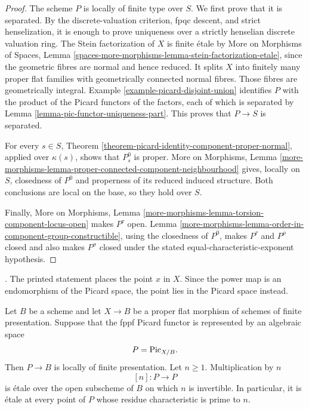 \begin{proof}
The scheme $P$ is locally of finite type over $S$. We first prove that it is
separated. By the discrete-valuation criterion, fpqc descent, and strict
henselization, it is enough to prove uniqueness over a strictly henselian
discrete valuation ring. The Stein factorization of $X$ is finite \'etale by
More on Morphisms of Spaces, Lemma
\ref{spaces-more-morphisms-lemma-stein-factorization-etale}, since the
geometric fibres are normal and hence reduced. It splits $X$ into finitely
many proper flat families with geometrically connected normal fibres. Those
fibres are geometrically integral. Example
\ref{example-picard-disjoint-union} identifies $P$ with the product of the
Picard functors of the factors, each of which is separated by Lemma
\ref{lemma-pic-functor-uniqueness-part}. This proves that $P\to S$ is
separated.

For every $s\in S$, Theorem
\ref{theorem-picard-identity-component-proper-normal}, applied over
$\kappa(s)$, shows that $P_s^0$ is proper. More on Morphisms, Lemma
\ref{more-morphisms-lemma-proper-connected-component-neighbourhood} gives,
locally on $S$, closedness of $P^0$ and properness of its reduced induced
structure. Both conclusions are local on the base, so they hold over $S$.

Finally, More on Morphisms, Lemma
\ref{more-morphisms-lemma-torsion-component-locus-open} makes $P^\tau$ open.
Lemma \ref{more-morphisms-lemma-order-in-component-group-constructible},
using the closedness of $P^0$, makes $P^\tau$ and $P^\rho$ closed and also
makes $P^\sigma$ closed under the stated equal-characteristic-exponent
hypothesis.
\end{proof}

\begin{theorem}
\label{theorem-picard-multiplication-etale}
\begin{reference}
\cite[Expos\'e 236, Theorem 2.5, p. 233]{FGA}. The printed statement
places the point $x$ in $X$. Since the power map is an endomorphism of the
Picard space, the point lies in the Picard space instead.
\end{reference}
Let $B$ be a scheme and let $X \to B$ be a proper flat morphism of schemes
of finite presentation. Suppose that the fppf Picard functor is represented
by an algebraic space
$$
P=\mathrm{Pic}_{X/B}.
$$
Then $P\to B$ is locally of finite presentation. Let $n \geq 1$.
Multiplication by $n$
$$
[n] : P \longrightarrow P
$$
is \'etale over the open subscheme of $B$ on which $n$ is invertible. In
particular, it is \'etale at every point of $P$ whose residue characteristic
is prime to $n$.
\end{theorem}


